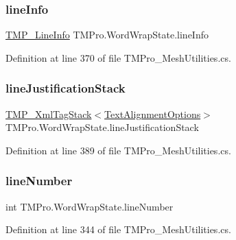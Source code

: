 \subsubsection{\texorpdfstring{lineInfo}{lineInfo}}
{\footnotesize\ttfamily \mbox{\hyperlink{struct_t_m_pro_1_1_t_m_p___line_info}{T\+M\+P\+\_\+\+Line\+Info}} T\+M\+Pro.\+Word\+Wrap\+State.\+line\+Info}



Definition at line 370 of file T\+M\+Pro\+\_\+\+Mesh\+Utilities.\+cs.

\mbox{\label{struct_t_m_pro_1_1_word_wrap_state_a1cb20837c77f7bae3aa21240b625ef2f}} 
\subsubsection{\texorpdfstring{lineJustificationStack}{lineJustificationStack}}
{\footnotesize\ttfamily \mbox{\hyperlink{struct_t_m_pro_1_1_t_m_p___xml_tag_stack}{T\+M\+P\+\_\+\+Xml\+Tag\+Stack}}$<$\mbox{\hyperlink{namespace_t_m_pro_a1dd743b58b1fd4057c00e4b98ab86301}{Text\+Alignment\+Options}}$>$ T\+M\+Pro.\+Word\+Wrap\+State.\+line\+Justification\+Stack}



Definition at line 389 of file T\+M\+Pro\+\_\+\+Mesh\+Utilities.\+cs.

\mbox{\label{struct_t_m_pro_1_1_word_wrap_state_ae6742cdebc21a512335aa31c86162f50}} 
\subsubsection{\texorpdfstring{lineNumber}{lineNumber}}
{\footnotesize\ttfamily int T\+M\+Pro.\+Word\+Wrap\+State.\+line\+Number}



Definition at line 344 of file T\+M\+Pro\+\_\+\+Mesh\+Utilities.\+cs.

\mbox{\label{struct_t_m_pro_1_1_word_wrap_state_a4060c068cfda0b875bf1c1dfe258c93f}} 
